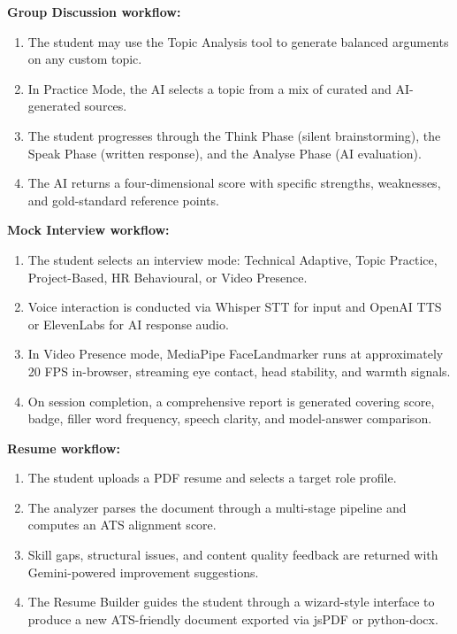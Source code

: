 \documentclass[12pt,a4paper]{report}
\begin{document}
\textbf{Group Discussion workflow:}
\begin{enumerate}[leftmargin=0.5in, label=\arabic*., topsep=4pt, itemsep=2pt]
    \item The student may use the Topic Analysis tool to generate balanced arguments on any custom topic.
    \item In Practice Mode, the AI selects a topic from a mix of curated and AI-generated sources.
    \item The student progresses through the Think Phase (silent brainstorming), the Speak Phase (written response), and the Analyse Phase (AI evaluation).
    \item The AI returns a four-dimensional score with specific strengths, weaknesses, and gold-standard reference points.
\end{enumerate}

\textbf{Mock Interview workflow:}
\begin{enumerate}[leftmargin=0.5in, label=\arabic*., topsep=4pt, itemsep=2pt]
    \item The student selects an interview mode: Technical Adaptive, Topic Practice, Project-Based, HR Behavioural, or Video Presence.
    \item Voice interaction is conducted via Whisper STT for input and OpenAI TTS or ElevenLabs for AI response audio.
    \item In Video Presence mode, MediaPipe FaceLandmarker runs at approximately 20 FPS in-browser, streaming eye contact, head stability, and warmth signals.
    \item On session completion, a comprehensive report is generated covering score, badge, filler word frequency, speech clarity, and model-answer comparison.
\end{enumerate}

\textbf{Resume workflow:}
\begin{enumerate}[leftmargin=0.5in, label=\arabic*., topsep=4pt, itemsep=2pt]
    \item The student uploads a PDF resume and selects a target role profile.
    \item The analyzer parses the document through a multi-stage pipeline and computes an ATS alignment score.
    \item Skill gaps, structural issues, and content quality feedback are returned with Gemini-powered improvement suggestions.
    \item The Resume Builder guides the student through a wizard-style interface to produce a new ATS-friendly document exported via jsPDF or python-docx.
\end{enumerate}
\end{document}
